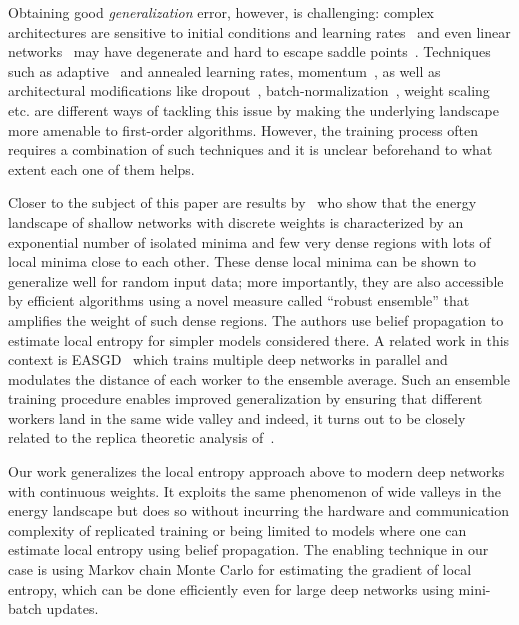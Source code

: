 \documentclass[10pt]{article}
\begin{document}
Obtaining good \emph{generalization} error, however, is challenging: complex architectures are sensitive to initial conditions and learning rates~\citep{sutskever2013importance} and even linear networks~\citep{kawaguchi2016deep} may have degenerate and hard to escape saddle points~\citep{ge2015escaping,anandkumar2016efficient}. Techniques such as adaptive~\citep{duchi2011adaptive} and annealed learning rates, momentum~\citep{tieleman2012lecture}, as well as architectural modifications like dropout~\citep{srivastava2014dropout}, batch-normalization~\citep{ioffe2015batch,cooijmans2016recurrent}, weight scaling~\citep{salimans2016weight} etc. are different ways of tackling this issue by making the underlying landscape more amenable to first-order algorithms. However, the training process often requires a combination of such techniques and it is unclear beforehand to what extent each one of them helps.

Closer to the subject of this paper are results by~\citet{baldassi2015subdominant,baldassi2016unreasonable,baldassi2016multilevel} who show that the energy landscape of shallow networks with discrete weights is characterized by an exponential number of isolated minima and few very dense regions with lots of local minima close to each other. These dense local minima can be shown to generalize well for random input data; more importantly, they are also accessible by efficient algorithms using a novel measure called ``robust ensemble'' that amplifies the weight of such dense regions. The authors use belief propagation to estimate local entropy for simpler models considered there. A related work in this context is EASGD~\citep{zhang2015deep} which trains multiple deep networks in parallel and modulates the distance of each worker to the ensemble average. Such an ensemble training procedure enables improved generalization by ensuring that different workers land in the same wide valley and indeed, it turns out to be closely related to the replica theoretic analysis of~\citep{baldassi2016unreasonable}.

Our work generalizes the local entropy approach above to modern deep networks with continuous weights. It exploits the same phenomenon of wide valleys in the energy landscape but does so without incurring the hardware and communication complexity of replicated training or being limited to models where one can estimate local entropy using belief propagation. The enabling technique in our case is using Markov chain Monte Carlo for estimating the gradient of local entropy, which can be done efficiently even for large deep networks using mini-batch updates.
\end{document}
